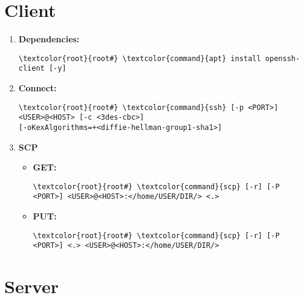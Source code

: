 \documentclass[10pt, a4paper, onecolumn, openany]{book} %
\begin{document}
\section{Client}
\begin{enumerate}
    \item \textbf{Dependencies:}
\begin{Verbatim}[commandchars=\\\{\}]
\textcolor{root}{root#} \textcolor{command}{apt} install openssh-client [-y]
\end{Verbatim}
    \item \textbf{Connect:}
\begin{Verbatim}[commandchars=\\\{\}]
\textcolor{root}{root#} \textcolor{command}{ssh} [-p <PORT>] <USER>@<HOST> [-c <3des-cbc>] 
[-oKexAlgorithms=+<diffie-hellman-group1-sha1>]
\end{Verbatim}
    \item \textbf{SCP}
    \begin{itemize}
        \item \textbf{GET:}
\begin{Verbatim}[commandchars=\\\{\}]
\textcolor{root}{root#} \textcolor{command}{scp} [-r] [-P <PORT>] <USER>@<HOST>:</home/USER/DIR/> <.>
\end{Verbatim}
        \item \textbf{PUT:}
\begin{Verbatim}[commandchars=\\\{\}]
\textcolor{root}{root#} \textcolor{command}{scp} [-r] [-P <PORT>] <.> <USER>@<HOST>:</home/USER/DIR/>
\end{Verbatim}
    \end{itemize}
\end{enumerate}
\section{Server}
\end{document}
